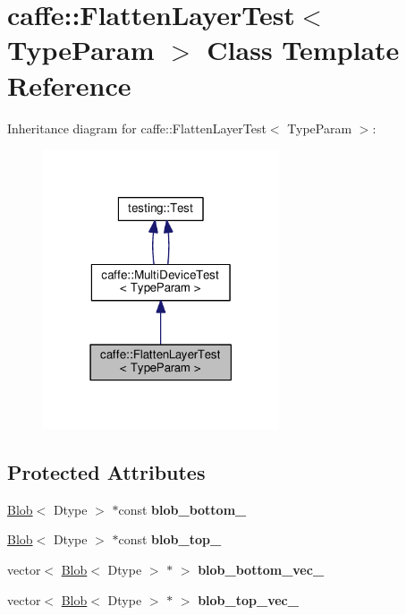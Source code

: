 \hypertarget{classcaffe_1_1_flatten_layer_test}{}\section{caffe\+:\+:Flatten\+Layer\+Test$<$ Type\+Param $>$ Class Template Reference}
\label{classcaffe_1_1_flatten_layer_test}


Inheritance diagram for caffe\+:\+:Flatten\+Layer\+Test$<$ Type\+Param $>$\+:
\nopagebreak
\begin{figure}[H]
\begin{center}
\leavevmode
\includegraphics[width=198pt]{classcaffe_1_1_flatten_layer_test__inherit__graph}
\end{center}
\end{figure}
\subsection*{Protected Attributes}
\begin{DoxyCompactItemize}
\item 
\mbox{\label{classcaffe_1_1_flatten_layer_test_a3a5feb51bbf45c2e8a6f903dcda1797b}} 
\mbox{\hyperlink{classcaffe_1_1_blob}{Blob}}$<$ Dtype $>$ $\ast$const {\bfseries blob\+\_\+bottom\+\_\+}
\item 
\mbox{\label{classcaffe_1_1_flatten_layer_test_a4bd71206a0f0454d38cd0d468f1944a4}} 
\mbox{\hyperlink{classcaffe_1_1_blob}{Blob}}$<$ Dtype $>$ $\ast$const {\bfseries blob\+\_\+top\+\_\+}
\item 
\mbox{\label{classcaffe_1_1_flatten_layer_test_a42cf37398c4b706889c6b441b45da21c}} 
vector$<$ \mbox{\hyperlink{classcaffe_1_1_blob}{Blob}}$<$ Dtype $>$ $\ast$ $>$ {\bfseries blob\+\_\+bottom\+\_\+vec\+\_\+}
\item 
\mbox{\label{classcaffe_1_1_flatten_layer_test_adb0fd4d599d4079266830dc65ba7fbbe}} 
vector$<$ \mbox{\hyperlink{classcaffe_1_1_blob}{Blob}}$<$ Dtype $>$ $\ast$ $>$ {\bfseries blob\+\_\+top\+\_\+vec\+\_\+}
\end{DoxyCompactItemize}
